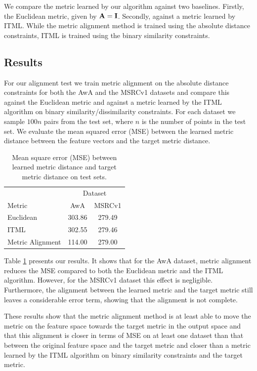 We compare the metric learned by our algorithm against two baselines. Firstly, the Euclidean metric, given by $\mathbf{A} = \mathbf{I}$. Secondly, against a metric learned by \acf{ITML}. \cite{davis2007information} While the metric alignment method is trained using the absolute distance constraints, \ac{ITML} is trained using the binary similarity constraints.


\subsection{Results}

For our alignment test we train metric alignment on the absolute distance constraints for both the AwA and the MSRCv1 datasets and compare this against the Euclidean metric and against a metric learned by the ITML algorithm on binary similarity/dissimilarity constraints. For each dataset we sample $100n$ pairs from the test set, where $n$ is the number of points in the test set. We evaluate the mean squared error (MSE) between the learned metric distance between the feature vectors and the target metric distance.

\begin{table}
\begin{center}
\caption{Mean square error (MSE) between learned metric distance and target metric distance on test sets.}
\label{tab:alignment}
\begin{tabular}{lcc}
\toprule
& \multicolumn{2}{c}{Dataset} \\
 Metric & AwA & MSRCv1 \\
\midrule
Euclidean & 303.86 & 279.49 \\
ITML & 302.55 & 279.46 \\
Metric Alignment & 114.00 & 279.00 \\
\bottomrule
\end{tabular}
\end{center}
\end{table}

Table \ref{tab:alignment} presents our results. It shows that for the AwA dataset, metric alignment reduces the MSE compared to both the Euclidean metric and the ITML algorithm. However, for the MSRCv1 dataset this effect is negligible. Furthermore, the alignment between the learned metric and the target metric still leaves a considerable error term, showing that the alignment is not complete.

These results show that the metric alignment method is at least able to move the metric on the feature space towards the target metric in the output space and that this alignment is closer in terms of MSE on at least one dataset than that between the original feature space and the target metric and closer than a metric learned by the ITML algorithm on binary similarity constraints and the target metric.


